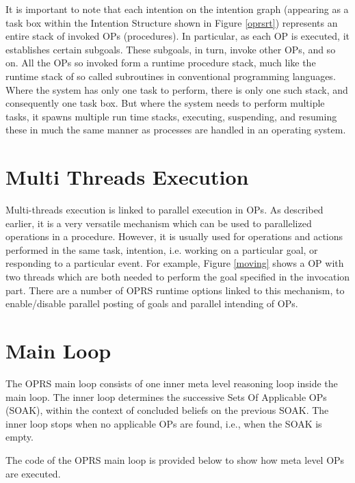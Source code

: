 It is important to note that each intention on the intention graph
(appearing as a task box within the Intention Structure shown in Figure
\ref{oprsrt}) represents an entire stack of invoked OPs (procedures).  In
particular, as each OP is executed, it establishes certain subgoals.
These subgoals, in turn, invoke other OPs, and so on.  All the OPs so
invoked form a runtime procedure stack, much like the runtime stack of so
called subroutines in conventional programming languages.  Where the
system has only one task to perform, there is only one such stack, and
consequently one task box.  But where the system needs to perform multiple
tasks, it spawns multiple run time stacks, executing, suspending, and
resuming these in much the same manner as processes are handled in an
operating system.

\section{Multi Threads Execution}


Multi-threads execution is linked to parallel execution in OPs. As
described earlier, it is a very versatile mechanism which can be used to
parallelized operations in a procedure. However, it is usually used for
operations and actions performed in the same task, intention, i.e. working on a
particular goal, or responding to a particular event. For example, Figure
\ref{moving} shows a OP with two threads which are both needed to perform the
goal specified in the invocation part. There are a number of OPRS runtime
options linked to this mechanism, to enable/disable parallel posting of goals
and parallel intending of OPs.

\section{\CPK{} Main Loop}

The OPRS main loop consists of one inner meta level reasoning loop
inside the main loop. The inner loop determines
the successive Sets Of Applicable OPs (SOAK), within the context of
concluded beliefs on the previous SOAK. The inner loop stops when no
applicable OPs are found, i.e., when the SOAK is empty.

The code of the OPRS main loop is provided below to show how meta level OPs are 
executed.

